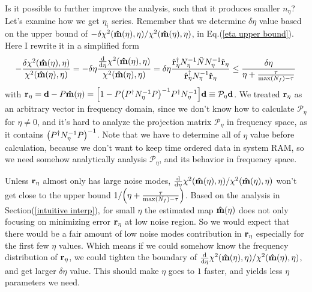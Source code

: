 \documentclass[11pt, letterpaper]{article}
\newcommand{\vbd}{\vb{d}}
\newcommand{\inv}[1]{#1^{-1}}
\newcommand{\hatm}{\vb{\hat{m}}}
\newcommand{\Pdagger}{P^{\dagger}}
\newcommand{\Nbar}{\bar{N}}
\newcommand{\PPinv}[1]{\inv{\qty(\Pdagger #1 P)}}
\begin{document}
Is it possible to further improve the analysis, such that it produces
smaller $n_{\eta}$?
Let's examine how we get $\eta_i$ series.
Remember that we determine $\delta\eta$ value based on the upper bound of 
$-\delta\chi^2(\hatm(\eta), \eta)/\chi^2(\hatm(\eta), \eta)$, in
Eq.(\ref{eta upper bound}).
Here I rewrite it in a simplified form
\begin{align}
-\frac{\delta\chi^2(\hatm(\eta), \eta)}{\chi^2(\hatm(\eta), \eta)}
= -\delta\eta
    \frac{\dv{\eta} \chi^2(\hatm(\eta), \eta)}
    {\chi^2(\hatm(\eta), \eta)}
= \delta\eta \frac{\hat{\vb{r}}_{\eta}^{\dagger} \inv{N}_{\eta} \Nbar 
    \inv{N}_{\eta} \hat{\vb{r}}_{\eta} }
    {\hat{\vb{r}}_{\eta}^{\dagger} \inv{N}_{\eta} \hat{\vb{r}}_{\eta} }
\leq  \frac{\delta \eta}{\eta + \frac{\tau}{\max(N_f) -\tau}}
\end{align}
with
$\vb{r}_{\eta} = \vbd - P\hatm(\eta) 
= \qty[ 1 - P\PPinv{\inv{N_{\eta}}}\Pdagger \inv{N_{\eta}}]\vbd
\equiv \mathcal{P}_{\eta} \vbd$.
We treated $\vb{r}_{\eta}$ as an arbitrary 
vector in frequency domain, since we don't know how to calculate 
$\mathcal{P}_{\eta}$ for $\eta \neq 0$, and it's hard to 
analyze the projection matrix $\mathcal{P}_{\eta}$ in frequency space,
as it contains $\PPinv{\inv{N_{\eta}}}$.
Note that we have to determine all of $\eta$ value before calculation, 
because we don't want to keep time ordered data in system RAM,
so we need somehow analytically analysis $\mathcal{P}_{\eta}$, and its behavior
in frequency space.

Unless $\vb{r}_{\eta}$ almost only has large noise modes,
$\dv{\eta}\chi^2(\hatm(\eta),\eta)/\chi^2(\hatm(\eta),\eta)$
won't get close to the upper bound
$1/\qty(\eta + \frac{\tau}{\max(N_f) -\tau})$.
Based on the analysis in Section(\ref{intuitive interp}),
for small $\eta$ the estimated map $\hatm(\eta)$ does not only focusing on 
minimizing error $\vb{r}_{\eta}$ at low noise region.
So we would expect that there would be a fair amount of low noise modes
contribution in $\vb{r}_{\eta}$ especially for the first few $\eta$ values.
Which means if we could somehow know the frequency distribution of 
$\vb{r}_{\eta}$, we could tighten the boundary of
$\dv{\eta}\chi^2(\hatm(\eta),\eta)/\chi^2(\hatm(\eta),\eta)$,
and get larger $\delta\eta$ value.
This should make $\eta$ goes to $1$ faster, and yields less $\eta$ parameters 
we need.
\end{document}
